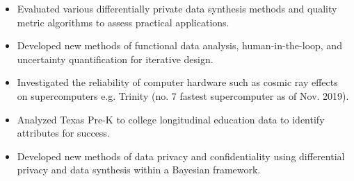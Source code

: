 \documentclass[11pt, letterpaper, roman]{moderncv} %
\begin{document}
\vspace{4pt}
{
\begin{itemize}
    \item Evaluated various differentially private data synthesis methods and quality metric algorithms to assess practical applications.
    \item Developed new methods of functional data analysis, human-in-the-loop, and uncertainty quantification for iterative design.
    \item Investigated the reliability of computer hardware such as cosmic ray effects on supercomputers e.g. Trinity (no. 7 fastest supercomputer as of Nov. 2019).
    \item Analyzed Texas Pre-K to college longitudinal education data to identify attributes for success.
\end{itemize}}

\vspace{4pt}

\vspace{4pt}
{
\begin{itemize}
    \item Developed new methods of data privacy and confidentiality using differential privacy and data synthesis within a Bayesian framework.
\end{itemize}}
\end{document}
